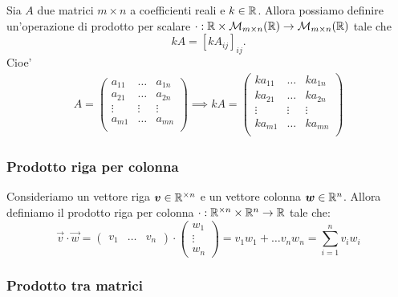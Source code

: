 Sia $A$ due matrici $m \times n$ a coefficienti reali e $k \in \mathbb{R}$. Allora possiamo definire un'operazione di prodotto per scalare $\cdot : \mathbb{R} \times \mathcal{M}_{m \times n}(\mathbb{R}) \to \mathcal{M}_{m \times n}(\mathbb{R})$ tale che \begin{equation}
    kA = [kA_{ij}]_{ij}.
\end{equation}
Cioe' \begin{gather*}
    A = \begin{pmatrix}
        a_{11}  & \dots     & a_{1n} \\
        a_{21}  & \dots     & a_{2n} \\
        \vdots  & \vdots    & \vdots \\
        a_{m1}  & \dots     & a_{mn} \\
    \end{pmatrix}
    \implies
    kA = \begin{pmatrix}
        ka_{11}  & \dots     & ka_{1n} \\
        ka_{21}  & \dots     & ka_{2n} \\
        \vdots   & \vdots    & \vdots \\
        ka_{m1}  & \dots     & ka_{mn} \\
    \end{pmatrix}  
\end{gather*}

\subsubsection{Prodotto riga per colonna}

Consideriamo un vettore riga $\bm{v} \in \mathbb{R}^{\times n}$ e un vettore colonna $\bm{w} \in \mathbb{R}^n$. Allora definiamo il prodotto riga per colonna $\cdot : \mathbb{R}^{\times n} \times \mathbb{R}^n \to \mathbb{R}$ tale che:
\begin{equation}
    \vec v \cdot \vec w = \begin{pmatrix}
        v_1 & \dots & v_n 
    \end{pmatrix} \cdot \begin{pmatrix}
        w_1 \\ \vdots \\ w_n
    \end{pmatrix} = v_1w_1 + \dots v_nw_n = \sum_{i = 1}^n v_iw_i
\end{equation}

\subsubsection{Prodotto tra matrici}

